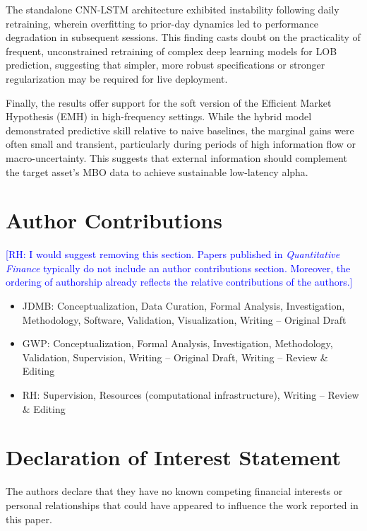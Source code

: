 \documentclass[10pt,a4paper,oneside]{article}
\newcommand{\rh}[1]{\textcolor{blue}{\textsf{[RH: #1]}}}
\providecommand{\DIFaddtex}[1]{{\protect\color{blue} \sf #1}} %
\providecommand{\DIFdeltex}[1]{{\protect\color{red} \scriptsize #1}} %
\providecommand{\DIFaddbegin}{} %
\providecommand{\DIFaddend}{} %
\providecommand{\DIFdelbegin}{} %
\providecommand{\DIFdelend}{} %
\providecommand{\DIFadd}[1]{\texorpdfstring{\DIFaddtex{#1}}{#1}} %
\providecommand{\DIFdel}[1]{\texorpdfstring{\DIFdeltex{#1}}{}} %
\newcommand{\DIFscaledelfig}{0.5}
\newlength{\DIFdelgraphicswidth} %
\newlength{\DIFdelgraphicsheight} %
\newcommand{\DIFaddincludegraphics}[2][]{{\color{blue}\fbox{\DIFOincludegraphics[#1]{#2}}}} %
\newcommand{\DIFdelincludegraphics}[2][]{%
\sbox{\DIFdelgraphicsbox}{\DIFOincludegraphics[#1]{#2}}%
\settoboxwidth{\DIFdelgraphicswidth}{\DIFdelgraphicsbox} %
\settoboxtotalheight{\DIFdelgraphicsheight}{\DIFdelgraphicsbox} %
\scalebox{\DIFscaledelfig}{%
\parbox[b]{\DIFdelgraphicswidth}{\usebox{\DIFdelgraphicsbox}\\[-\baselineskip] \rule{\DIFdelgraphicswidth}{0em}}\llap{\resizebox{\DIFdelgraphicswidth}{\DIFdelgraphicsheight}{%
\setlength{\unitlength}{\DIFdelgraphicswidth}%
\begin{picture}(1,1)%
\thicklines\linethickness{2pt} %
{\color[rgb]{1,0,0}\put(0,0){\framebox(1,1){}}}%
{\color[rgb]{1,0,0}\put(0,0){\line( 1,1){1}}}%
{\color[rgb]{1,0,0}\put(0,1){\line(1,-1){1}}}%
\end{picture}%
}\hspace*{3pt}}} %
} %
\DeclareRobustCommand{\DIFaddbegin}{\DIFOaddbegin \let\includegraphics\DIFaddincludegraphics} %
\DeclareRobustCommand{\DIFaddend}{\DIFOaddend \let\includegraphics\DIFOincludegraphics} %
\DeclareRobustCommand{\DIFdelbegin}{\DIFOdelbegin \let\includegraphics\DIFdelincludegraphics} %
\DeclareRobustCommand{\DIFdelend}{\DIFOaddend \let\includegraphics\DIFOincludegraphics} %
\begin{document}
The standalone CNN-LSTM architecture exhibited instability following daily retraining, wherein overfitting to prior-day dynamics led to performance degradation in subsequent sessions. This finding casts doubt on the practicality of frequent, unconstrained retraining of complex deep learning models for LOB prediction, suggesting that simpler, more robust specifications or stronger regularization may be required for live deployment.

Finally, the results offer support for the soft version of the Efficient Market Hypothesis (EMH) in high-frequency settings. While the hybrid model demonstrated predictive skill relative to naive baselines, the marginal gains were often small and transient, particularly during periods of high information flow or macro-uncertainty. This suggests that external information should complement the target asset's MBO data to achieve sustainable low-latency alpha.



\section{Author Contributions}
\DIFdelbegin \DIFdel{\rh{I would suggest removing this section. Papers published in \emph{Quantitative Finance} typically do not include an author contributions section. Moreover, the ordering of authorship already reflects the relative contributions of the authors.}
}\DIFdelend \DIFaddbegin 

\DIFaddend \begin{itemize}
    \item JDMB: Conceptualization, Data Curation, Formal Analysis, Investigation, Methodology, Software, Validation, Visualization, Writing – Original Draft
    \item GWP: Conceptualization, Formal Analysis, Investigation, Methodology, Validation, Supervision, Writing – Original Draft, Writing – Review \& Editing 
    \item RH: Supervision, Resources (computational infrastructure), Writing – Review \& Editing
\end{itemize}
\DIFaddbegin 

\section*{\DIFadd{Declaration of Interest Statement}}
\DIFadd{The authors declare that they have no known competing financial interests or personal relationships that could have appeared to influence the work reported in this paper.
}\DIFaddend 

\newpage




\newpage
\end{document}
